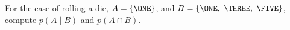   For the case of rolling a die, $A = \{\ONE\}$, and
  $B = \{ \ONE, $ $\THREE,$ $\FIVE \}$, compute
  $p(A \mid B)$ and $p(A \cap B)$.

